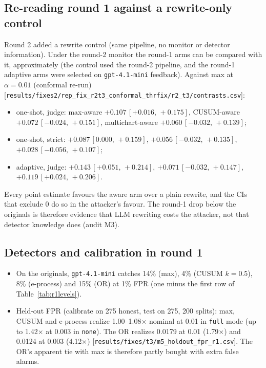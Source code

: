 \documentclass[11pt]{article}
\newcommand{\src}[1]{{\footnotesize\textcolor{ink2}{[\nolinkurl{#1}]}}}
\newcommand{\ci}[2]{\,[#1,\,#2]}
\begin{document}
\subsection{Re-reading round 1 against a rewrite-only control}\label{sec:r1reread}
Round 2 added a rewrite control (same pipeline, no monitor or detector information). Under the round-2 monitor the round-1 arms can be compared with it, approximately (the control used the round-2 pipeline, and the round-1 adaptive arms were selected on \texttt{gpt-4.1-mini} feedback). Against max at $\alpha=0.01$ (conformal re-run) \src{results/fixes2/rep_fix_r2t3_conformal_thrfix/r2_t3/contrasts.csv}:
\begin{itemize}
\item one-shot, judge: max-aware $+0.107\ci{+0.016}{+0.175}$, CUSUM-aware $+0.072\ci{-0.024}{+0.151}$, multichart-aware $+0.060\ci{-0.032}{+0.139}$;
\item one-shot, strict: $+0.087\ci{0.000}{+0.159}$, $+0.056\ci{-0.032}{+0.135}$, $+0.028\ci{-0.056}{+0.107}$;
\item adaptive, judge: $+0.143\ci{+0.051}{+0.214}$, $+0.071\ci{-0.032}{+0.147}$, $+0.119\ci{+0.024}{+0.206}$.
\end{itemize}
Every point estimate favours the aware arm over a plain rewrite, and the CIs that exclude 0 do so in the attacker's favour. The round-1 drop below the originals is therefore evidence that LLM rewriting costs the attacker, not that detector knowledge does (audit M3).

\subsection{Detectors and calibration in round 1}
\begin{itemize}
\item On the originals, \texttt{gpt-4.1-mini} catches 14\% (max), 4\% (CUSUM $k=0.5$), 8\% (e-process) and 15\% (OR) at 1\% FPR (one minus the first row of Table~\ref{tab:r1levels}).
\item Held-out FPR (calibrate on 275 honest, test on 275, 200 splits): max, CUSUM and e-process realize 1.00--1.08$\times$ nominal at 0.01 in \texttt{full} mode (up to 1.42$\times$ at 0.003 in \texttt{none}). The OR realizes 0.0179 at 0.01 (1.79$\times$) and 0.0124 at 0.003 (4.12$\times$) \src{results/fixes/t3/m5_holdout_fpr_r1.csv}. The OR's apparent tie with max is therefore partly bought with extra false alarms.
\end{itemize}
\end{document}
